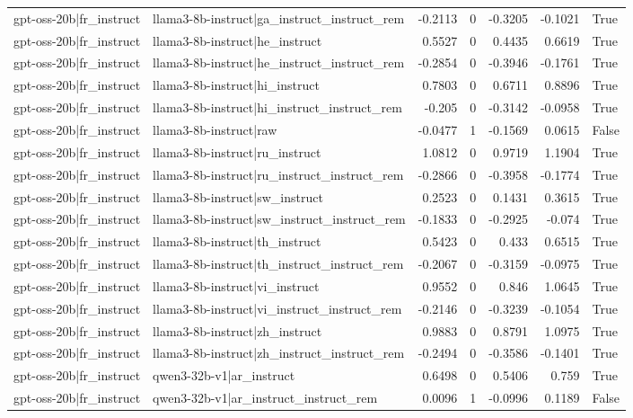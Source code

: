 \begin{table}
\begin{tabular}{l l r r r r l}
gpt-oss-20b|fr_instruct & llama3-8b-instruct|ga_instruct_instruct_rem & -0.2113 & 0 & -0.3205 & -0.1021 & True \\
gpt-oss-20b|fr_instruct & llama3-8b-instruct|he_instruct & 0.5527 & 0 & 0.4435 & 0.6619 & True \\
gpt-oss-20b|fr_instruct & llama3-8b-instruct|he_instruct_instruct_rem & -0.2854 & 0 & -0.3946 & -0.1761 & True \\
gpt-oss-20b|fr_instruct & llama3-8b-instruct|hi_instruct & 0.7803 & 0 & 0.6711 & 0.8896 & True \\
gpt-oss-20b|fr_instruct & llama3-8b-instruct|hi_instruct_instruct_rem & -0.205 & 0 & -0.3142 & -0.0958 & True \\
gpt-oss-20b|fr_instruct & llama3-8b-instruct|raw & -0.0477 & 1 & -0.1569 & 0.0615 & False \\
gpt-oss-20b|fr_instruct & llama3-8b-instruct|ru_instruct & 1.0812 & 0 & 0.9719 & 1.1904 & True \\
gpt-oss-20b|fr_instruct & llama3-8b-instruct|ru_instruct_instruct_rem & -0.2866 & 0 & -0.3958 & -0.1774 & True \\
gpt-oss-20b|fr_instruct & llama3-8b-instruct|sw_instruct & 0.2523 & 0 & 0.1431 & 0.3615 & True \\
gpt-oss-20b|fr_instruct & llama3-8b-instruct|sw_instruct_instruct_rem & -0.1833 & 0 & -0.2925 & -0.074 & True \\
gpt-oss-20b|fr_instruct & llama3-8b-instruct|th_instruct & 0.5423 & 0 & 0.433 & 0.6515 & True \\
gpt-oss-20b|fr_instruct & llama3-8b-instruct|th_instruct_instruct_rem & -0.2067 & 0 & -0.3159 & -0.0975 & True \\
gpt-oss-20b|fr_instruct & llama3-8b-instruct|vi_instruct & 0.9552 & 0 & 0.846 & 1.0645 & True \\
gpt-oss-20b|fr_instruct & llama3-8b-instruct|vi_instruct_instruct_rem & -0.2146 & 0 & -0.3239 & -0.1054 & True \\
gpt-oss-20b|fr_instruct & llama3-8b-instruct|zh_instruct & 0.9883 & 0 & 0.8791 & 1.0975 & True \\
gpt-oss-20b|fr_instruct & llama3-8b-instruct|zh_instruct_instruct_rem & -0.2494 & 0 & -0.3586 & -0.1401 & True \\
gpt-oss-20b|fr_instruct & qwen3-32b-v1|ar_instruct & 0.6498 & 0 & 0.5406 & 0.759 & True \\
gpt-oss-20b|fr_instruct & qwen3-32b-v1|ar_instruct_instruct_rem & 0.0096 & 1 & -0.0996 & 0.1189 & False \\

\end{tabular}
\end{table}
